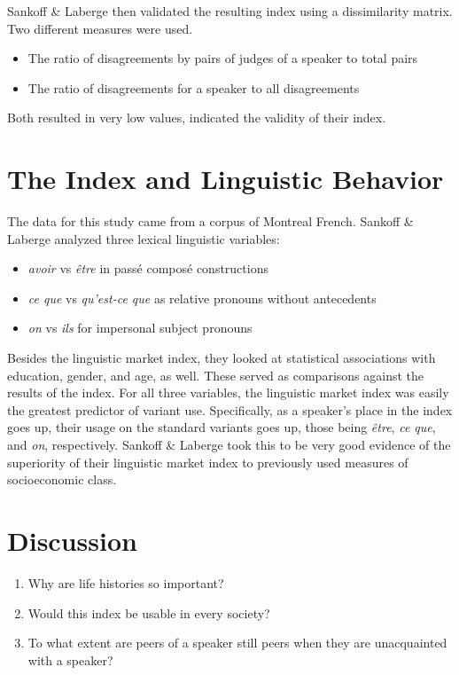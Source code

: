 \documentclass{article}
\newcommand{\lexi}[1]{\textit{#1}}
\begin{document}
    Sankoff \& Laberge then validated the resulting index using a dissimilarity matrix.
    Two different measures were used.
    \begin{itemize}
      \item The ratio of disagreements by pairs of judges of a speaker to total pairs
      \item The ratio of disagreements for a speaker to all disagreements
    \end{itemize}
    Both resulted in very low values, indicated the validity of their index.

  \section{The Index and Linguistic Behavior}
    The data for this study came from a corpus of Montreal French.
    Sankoff \& Laberge analyzed three lexical linguistic variables:
    \begin{itemize}
      \item \lexi{avoir} vs \lexi{être} in passé composé constructions
      \item \lexi{ce que} vs \lexi{qu'est-ce que} as relative pronouns without antecedents
      \item \lexi{on} vs \lexi{ils} for impersonal subject pronouns
    \end{itemize}

    Besides the linguistic market index, they looked at statistical associations with education, gender, and age, as well.
    These served as comparisons against the results of the index.
    For all three variables, the linguistic market index was easily the greatest predictor of variant use.
    Specifically, as a speaker's place in the index goes up, their usage on the standard variants goes up, those being \lexi{être}, \lexi{ce que}, and \lexi{on}, respectively.
    Sankoff \& Laberge took this to be very good evidence of the superiority of their linguistic market index to previously used measures of socioeconomic class.

  \section{Discussion}
    \begin{enumerate}
      \item Why are life histories so important?
      \item Would this index be usable in every society?
      \item To what extent are peers of a speaker still peers when they are unacquainted with a speaker?
    \end{enumerate}
\end{document}
